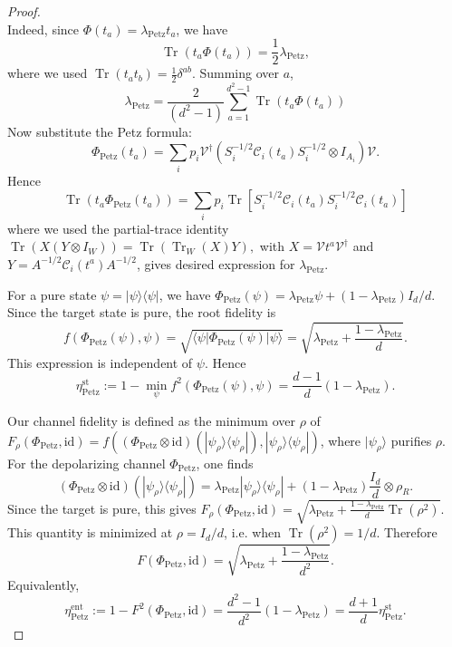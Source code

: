 \documentclass[11pt,letterpaper]{article}
\theoremstyle{plain}
\theoremstyle{plain}
\theoremstyle{plain}
\theoremstyle{plain}
\theoremstyle{plain}
\theoremstyle{plain}
\theoremstyle{plain}
\theoremstyle{definition}
\theoremstyle{plain}
\begin{document}
\begin{proof}
\begin{equation}
\end{equation}
Indeed, since $\Phi\left(t_a\right)=\lambda_{\text{Petz}} t_a$, we have
$$
\operatorname{Tr}\left(t_a \Phi\left(t_a\right)\right)=\frac{1}{2} \lambda_{\text{Petz}},
$$
where we used $\operatorname{Tr}\left(t_a t_b\right)=\frac{1}{2} \delta^{a b}$. Summing over $a$,
$$
\lambda_{\text{Petz}}=\frac{2}{\left(d^2-1\right)} \sum_{a=1}^{d^2-1} \operatorname{Tr}\left(t_a \Phi\left(t_a\right)\right)
$$
Now substitute the Petz formula:
$$
\Phi_{\mathrm{Petz}}\left(t_a\right)=\sum_i p_i \mathcal{V}^{\dagger}\left(S_i^{-1 / 2} \mathcal{C}_i\left(t_a\right) S_i^{-1 / 2} \otimes I_{A_i}\right) \mathcal{V}.
$$
Hence
$$
\operatorname{Tr}\left(t_a \Phi_{\text{Petz}}\left(t_a\right)\right)=\sum_i p_i \operatorname{Tr}\left[S_i^{-1 / 2} 
\mathcal{C}_i\left(t_a\right) S_i^{-1 / 2} \mathcal{C}_i\left(t_a\right)\right]
$$
where we used the partial-trace identity
$
\operatorname{Tr}\left(X\left(Y \otimes I_W\right)\right)=\operatorname{Tr}\left(\operatorname{Tr}_W(X) Y\right),
$
with $X=\mathcal{V} t^a \mathcal{V}^{\dagger}$ and $Y=A^{-1 / 2} \mathcal{C}_i\left(t^a\right) A^{-1 / 2}$, gives desired expression for $\lambda_{\mathrm{Petz}}$.

For a pure state \(\psi=|\psi\rangle\langle\psi|\), we have \(\Phi_{\mathrm{Petz}}(\psi)=\lambda_{\mathrm{Petz}}\psi+(1-\lambda_{\mathrm{Petz}})I_d/d\). 
Since the target state is pure, the root fidelity is
\[
f(\Phi_{\mathrm{Petz}}(\psi),\psi)
=
\sqrt{\langle\psi|\Phi_{\mathrm{Petz}}(\psi)|\psi\rangle}
=
\sqrt{\lambda_{\mathrm{Petz}}+\frac{1-\lambda_{\mathrm{Petz}}}{d}} .
\]
This expression is independent of \(\psi\). Hence
\[
\eta_{\mathrm{Petz}}^{\mathrm{st}}
:=
1-\min_{\psi}f^2(\Phi_{\mathrm{Petz}}(\psi),\psi)
=
\frac{d-1}{d}(1-\lambda_{\mathrm{Petz}}).
\]

Our channel fidelity is defined as the minimum over \(\rho\) of \(F_\rho(\Phi_{\mathrm{Petz}},\mathrm{id})=f((\Phi_{\mathrm{Petz}}\otimes\mathrm{id})(|\psi_\rho\rangle\langle\psi_\rho|),|\psi_\rho\rangle\langle\psi_\rho|)\), where \(|\psi_\rho\rangle\) purifies \(\rho\). 
For the depolarizing channel \(\Phi_{\mathrm{Petz}}\), one finds
\[
(\Phi_{\mathrm{Petz}}\otimes \mathrm{id})(|\psi_\rho\rangle\langle\psi_\rho|)
=
\lambda_{\mathrm{Petz}}|\psi_\rho\rangle\langle\psi_\rho|
+(1-\lambda_{\mathrm{Petz}})\frac{I_d}{d}\otimes \rho_R .
\]
Since the target is pure, this gives \(F_\rho(\Phi_{\mathrm{Petz}},\mathrm{id})=\sqrt{\lambda_{\mathrm{Petz}}+\frac{1-\lambda_{\mathrm{Petz}}}{d}\operatorname{Tr}(\rho^2)}\). 
This quantity is minimized at \(\rho=I_d/d\), i.e. when \(\operatorname{Tr}(\rho^2)=1/d\). Therefore
\[
F(\Phi_{\mathrm{Petz}},\mathrm{id})
=
\sqrt{\lambda_{\mathrm{Petz}}+\frac{1-\lambda_{\mathrm{Petz}}}{d^2}} .
\]
Equivalently,
\[
\eta_{\mathrm{Petz}}^{\mathrm{ent}}
:=
1-F^2(\Phi_{\mathrm{Petz}},\mathrm{id})
=
\frac{d^2-1}{d^2}(1-\lambda_{\mathrm{Petz}})
=
\frac{d+1}{d}\eta_{\mathrm{Petz}}^{\mathrm{st}} .
\]


\end{proof}
\end{document}
